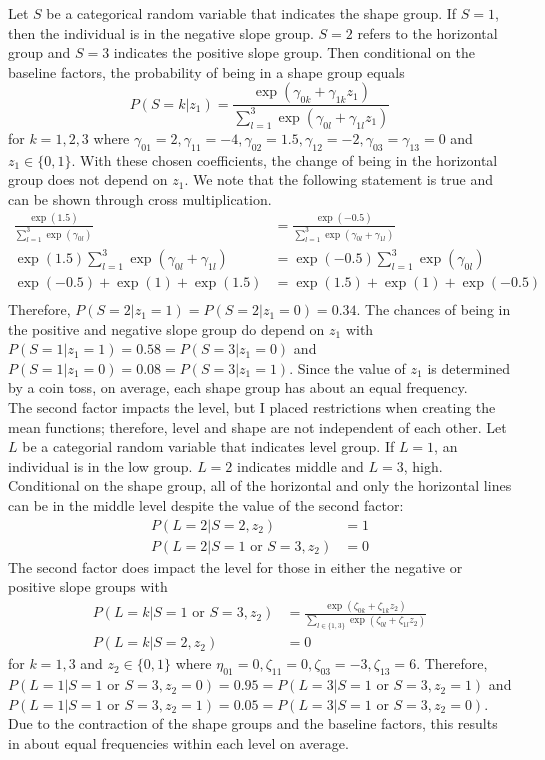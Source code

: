 \documentclass[12pt]{article}
\begin{document}
Let $S$ be a categorical random variable that indicates the shape group. If $S=1$, then the individual is in the negative slope group. $S=2$ refers to the horizontal group and $S=3$ indicates the positive slope group. Then conditional on the baseline factors, the probability of being in a shape group equals
$$P(S=k |z_{1}) = \frac{\exp(\gamma_{0k}+\gamma_{1k}z_{1})}{\sum^{3}_{l=1} \exp(\gamma_{0l}+\gamma_{1l}z_{1})}$$
for $k=1,2,3$ where $\gamma_{01}=2,\gamma_{11} = -4,\gamma_{02}=1.5,\gamma_{12}=-2,\gamma_{03}=\gamma_{13} = 0$ and $z_{1}\in\{0,1\}$. With these chosen coefficients, the change of being in the horizontal group does not depend on $z_{1}$. We note that the following statement is true and can be shown through cross multiplication.
\begin{align*}\frac{\exp(1.5)}{\sum^{3}_{l=1} \exp(\gamma_{0l})} & =\frac{\exp(-0.5)}{\sum^{3}_{l=1} \exp(\gamma_{0l}+\gamma_{1l})}\\
\exp(1.5)\sum^{3}_{l=1} \exp(\gamma_{0l}+\gamma_{1l}) & =\exp(-0.5)\sum^{3}_{l=1} \exp(\gamma_{0l})\\
\exp(-0.5)+\exp(1)+\exp(1.5)& =\exp(1.5)+\exp(1)+\exp(-0.5)\\
\end{align*}
Therefore, $P(S=2|z_{1}=1) = P(S=2|z_{1}=0) = 0.34$. The chances of being in the positive and negative slope group do depend on $z_{1}$ with $P(S=1|z_{1}=1) = 0.58 = P(S=3|z_{1}=0)$ and $P(S=1|z_{1}=0) = 0.08 = P(S=3|z_{1}=1)$. Since the value of $z_{1}$ is determined by a coin toss, on average, each shape group has about an equal  frequency. \\

The second factor impacts the level, but I placed restrictions when creating the mean functions; therefore, level and shape are not independent of each other. Let $L$ be a categorial random variable that indicates level group. If $L=1$, an individual is in the low group. $L=2$ indicates middle and $L=3$, high. Conditional on the shape group, all of the horizontal and only the horizontal lines can be in the middle level despite the value of the second factor:
\begin{align*}
P(L=2|S=2, z_{2}) & = 1\\
P(L=2|S=1 \text{ or } S=3, z_{2}) & = 0
\end{align*}
The second factor does impact the level for those in either the negative or positive slope groups with
\begin{align*}
P(L=k|S=1 \text{ or } S=3,z_{2}) & = \frac{\exp(\zeta_{0k}+\zeta_{1k} z_{2})}{\sum_{l\in\{1,3\} }\exp(\zeta_{0l}+\zeta_{1l}z_{2})}\\
P(L=k|S=2,z_{2}) & =0
\end{align*}
for $k=1,3$ and $z_{2}\in\{0,1\}$ where $\eta_{01}=0,\zeta_{11}=0,\zeta_{03}=-3,\zeta_{13}=6$. Therefore, $P(L=1|S=1 \text{ or }S=3,z_{2}=0) = 0.95 = P(L=3|S=1 \text{ or }S=3,z_{2}=1)$ and $P(L=1|S=1 \text{ or }S=3,z_{2}=1) = 0.05 = P(L=3|S=1 \text{ or }S=3,z_{2}=0)$.  Due to the contraction of the shape groups and the baseline factors, this results in about equal frequencies within each level on average.\\
\end{document}
